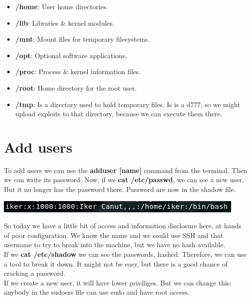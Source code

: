 \documentclass[11pt,a4paper]{article}
\begin{document}
\begin{itemize}
\item \textbf{/home}: User home directories.
\item \textbf{/lib}: Libraries \& kernel modules.
\item \textbf{/mnt}: Mount files for temporary filesystems.
\item \textbf{/opt}: Optional software applications.
\item \textbf{/proc}: Process \& kernel information files.
\item \textbf{/root}: Home directory for the root user.
\item \textbf{/tmp}: Is a directory used to hold temporary files. Is is a d777, so we might upload exploits to that directory, because we can execute them there.
\end{itemize}
\newpage

\section{Add users}
To add users we can use the \textbf{adduser [name]} command from the terminal. Then we can write its password. Now, if we \textbf{cat /etc/passwd}, we can see a new user. But it no longer has the password there. Password are now in the shadow file.
\begin{center}
\includegraphics[scale=.75]{passwd.png} 
\end{center}

So today we have a little bit of access and information disclosure here, at hands of poor configuration. We know the name and we could use SSH and that username to try to break into the machine, but we have no hash available.\\

If we \textbf{cat /etc/shadow} we can see the passwords, hashed. Therefore, we can use a tool to break it down. It might not be easy, but there is a good chance of cracking a password.\\

If we create a new user, it will have lower priviliges. But we can change this: anybody in the sudoers file can use sudo and have root access.
\end{document}

